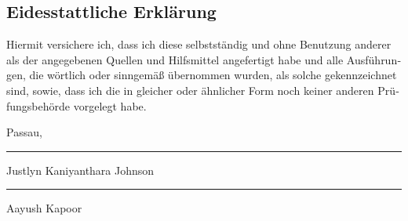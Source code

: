 \begin{german}
\chapter{Eidesstattliche Erklärung}

	Hiermit versichere ich, dass ich diese \thesisType{} selbstständig und ohne Benutzung anderer als der angegebenen Quellen und Hilfsmittel angefertigt habe und alle Ausführungen, die wörtlich oder sinngemäß übernommen wurden, als solche gekennzeichnet sind, sowie, dass ich die \thesisType{} in gleicher oder ähnlicher Form noch keiner anderen Prüfungsbehörde vorgelegt habe.

	\vspace{3cm}

	Passau, \thedate

	\vspace{2cm}

	\parbox{7cm}{\hrule \strut Justlyn Kaniyanthara Johnson}
	\hfill
	\parbox{7cm}{\hrule \strut Aayush Kapoor}
\end{german}

